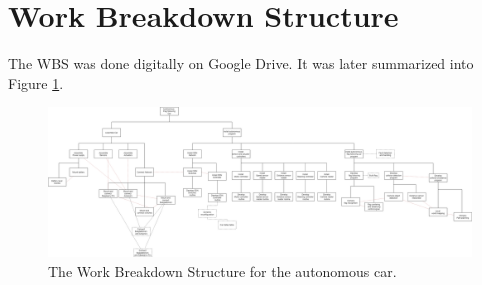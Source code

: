 \documentclass[11pt, titlepage]{article} %
\begin{document}
\section{Work Breakdown Structure}
The WBS was done digitally on Google Drive. It was later summarized into
Figure \ref{fig:wbs}.
\begin{figure}
    \centering
    \includegraphics[width=\textwidth]{wbs.png}
    \caption{The Work Breakdown Structure for the autonomous car.}
    \label{fig:wbs}
\end{figure}
\end{document}

